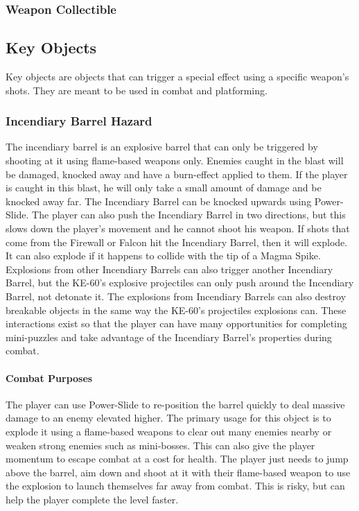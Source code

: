 \documentclass[12pt]{article}
\begin{document}
\subsubsection{Weapon Collectible}

\subsection{Key Objects}

Key objects are objects that can trigger a special effect using a specific weapon's shots. They are meant to be used in combat and platforming.

\subsubsection{Incendiary Barrel Hazard}

The incendiary barrel is an explosive barrel that can only be triggered by shooting at it using flame-based weapons only. Enemies caught in the blast will be damaged, knocked away and have a burn-effect applied to them. If the player is caught in this blast, he will only take a small amount of damage and be knocked away far. The Incendiary Barrel can be knocked upwards using Power-Slide. The player can also push the Incendiary Barrel in two directions, but this slows down the player's movement and he cannot shoot his weapon. If shots that come from the Firewall or Falcon hit the Incendiary Barrel, then it will explode. It can also explode if it happens to collide with the tip of a Magma Spike. Explosions from other Incendiary Barrels can also trigger another Incendiary Barrel, but the KE-60's explosive projectiles can only push around the Incendiary Barrel, not detonate it. The explosions from Incendiary Barrels can also destroy breakable objects in the same way the KE-60's projectiles explosions can. These interactions exist so that the player can have many opportunities for completing mini-puzzles and take advantage of the Incendiary Barrel's properties during combat. 

\paragraph{Combat Purposes}

The player can use Power-Slide to re-position the barrel quickly to deal massive damage to an enemy elevated higher. The primary usage for this object is to explode it using a flame-based weapons to clear out many enemies nearby or weaken strong enemies such as mini-bosses. This can also give the player momentum to escape combat at a cost for health. The player just needs to jump above the barrel, aim down and shoot at it with their flame-based weapon to use the explosion to launch themselves far away from combat. This is risky, but can help the player complete the level faster. 
\end{document}
